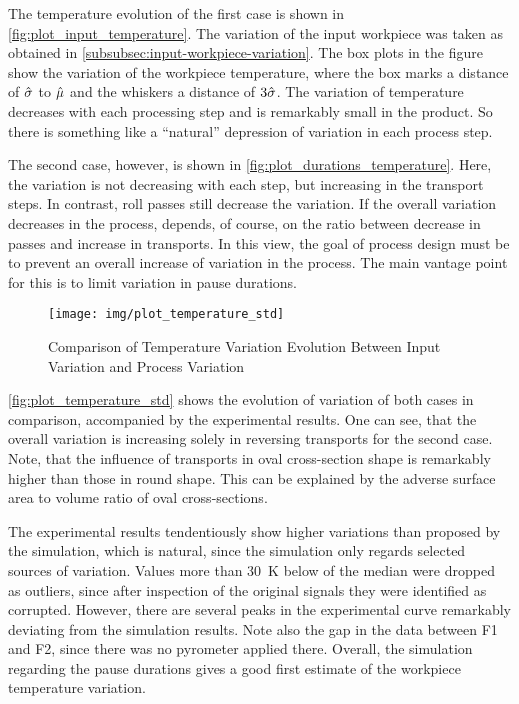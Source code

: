 The temperature evolution of the first case is shown in \autoref{fig:plot_input_temperature}.
The variation of the input workpiece was taken as obtained in \autoref{subsubsec:input-workpiece-variation}.
The box plots in the figure show the variation of the workpiece temperature, where the box marks a distance of ${\hat{{\sigma}}}$ to ${\hat{{\mu}}}$ and the whiskers a distance of $3{\hat{{\sigma}}}$.
The variation of temperature decreases with each processing step and is remarkably small in the product.
So there is something like a ``natural'' depression of variation in each process step.

The second case, however, is shown in \autoref{fig:plot_durations_temperature}.
Here, the variation is not decreasing with each step, but increasing in the transport steps.
In contrast, roll passes still decrease the variation.
If the overall variation decreases in the process, depends, of course, on the ratio between decrease in passes and increase in transports.
In this view, the goal of process design must be to prevent an overall increase of variation in the process.
The main vantage point for this is to limit variation in pause durations.

\begin{figure}
    \centering
    \texttt{[image: img/plot\_temperature\_std]}
    \caption{Comparison of Temperature Variation Evolution Between Input Variation and Process Variation}
    \label{fig:plot_temperature_std}
\end{figure}

\autoref{fig:plot_temperature_std} shows the evolution of variation of both cases in comparison, accompanied by the experimental results.
One can see, that the overall variation is increasing solely in reversing transports for the second case.
Note, that the influence of transports in oval cross-section shape is remarkably higher than those in round shape.
This can be explained by the adverse surface area to volume ratio of oval cross-sections.

The experimental results tendentiously show higher variations than proposed by the simulation, which is natural, since the simulation only regards selected sources of variation.
Values more than \qty{30}{\kelvin} below of the median were dropped as outliers, since after inspection of the original signals they were identified as corrupted.
However, there are several peaks in the experimental curve remarkably deviating from the simulation results.
Note also the gap in the data between F1 and F2, since there was no pyrometer applied there.
Overall, the simulation regarding the pause durations gives a good first estimate of the workpiece temperature variation.

